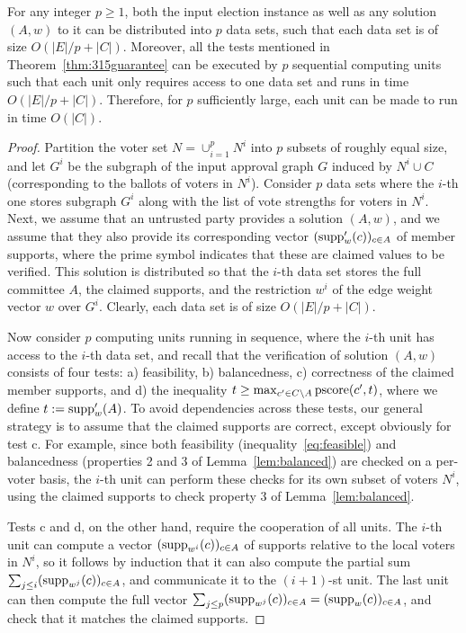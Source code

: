 \begin{lemma}\label{lem:parallel}
For any integer $p\geq 1$, both the input election instance as well as any solution $(A,w)$ to it can be distributed into $p$ data sets, such that each data set is of size $O(|E|/p + |C|)$. 
Moreover, all the tests mentioned in Theorem~\ref{thm:315guarantee} can be executed by $p$ sequential computing units such that each unit only requires access to one data set and runs in time $O(|E|/p + |C|)$. 
Therefore, for $p$ sufficiently large, each unit can be made to run in time $O(|C|)$.
\end{lemma}

\begin{proof}
Partition the voter set $N=\cup_{i=1}^p N^i$ into $p$ subsets of roughly equal size, and let $G^i$ be the subgraph of the input approval graph $G$ induced by $N^i\cup C$ (corresponding to the ballots of voters in $N^i$). 
Consider $p$ data sets where the $i$-th one stores subgraph $G^i$ along with the list of vote strengths for voters in $N^i$. 
%
Next, we assume that an untrusted party provides a solution $(A,w)$, and we assume that they also provide its corresponding vector $(\operatorname{supp}'_w(c))_{c\in A}$ of member supports, where the prime symbol indicates that these are claimed values to be verified. 
This solution is distributed so that the $i$-th data set stores the full committee $A$, the claimed supports, and the restriction $w^i$ of the edge weight vector $w$ over $G^i$. 
Clearly, each data set is of size $O(|E|/p + |C|)$.

Now consider $p$ computing units running in sequence, where the $i$-th unit has access to the $i$-th data set, and recall that the verification of solution $(A,w)$ consists of four tests: a) feasibility, b) balancedness, c) correctness of the claimed member supports, and d) the inequality $t\geq \max_{c'\in C\setminus A} \operatorname{pscore}(c',t)$, where we define $t:=\operatorname{supp}'_w(A)$. 
To avoid dependencies across these tests, our general strategy is to assume that the claimed supports are correct, except obviously for test c. 
For example, since both feasibility (inequality~\ref{eq:feasible}) and balancedness (properties 2 and 3 of Lemma~\ref{lem:balanced}) are checked on a per-voter basis, the $i$-th unit can perform these checks for its own subset of voters $N^i$, using the claimed supports to check property 3 of Lemma~\ref{lem:balanced}. 

Tests c and d, on the other hand, require the cooperation of all units. 
The $i$-th unit can compute a vector $(\operatorname{supp}_{w^i}(c))_{c\in A}$ of supports relative to the local voters in $N^i$, so it follows by induction that it can also compute the partial sum $\sum_{j\leq i} (\operatorname{supp}_{w^j}(c))_{c\in A}$, and communicate it to the $(i+1)$-st unit. The last unit can then compute the full vector $\sum_{j\leq p} (\operatorname{supp}_{w^j}(c))_{c\in A}=(\operatorname{supp}_{w}(c))_{c\in A}$, and check that it matches the claimed supports. 


\end{proof}
